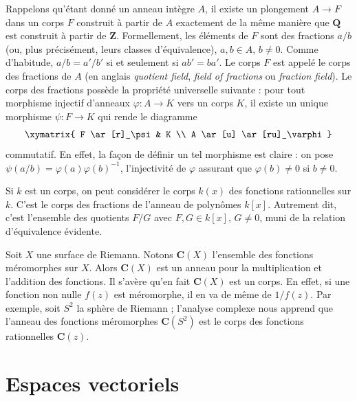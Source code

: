 \begin{example}
\label{example-quotient-field}
Rappelons qu'étant donné un anneau intègre $A$, il existe un plongement $A \to F$ dans un
corps $F$ construit à partir de $A$ exactement de la même manière que
$\mathbf{Q}$ est construit à partir de $\mathbf{Z}$. Formellement, les éléments
de $F$ sont des fractions $a/b$ (ou, plus précisément, leurs classes d'équivalence),
$a, b \in A$, $b \not = 0$. Comme d'habitude, $a/b = a'/b'$ si et seulement si $ab' = ba'$.
Le corps $F$ est appelé le corps des fractions de $A$ (en anglais
{\it quotient field}, {\it field of fractions} ou {\it fraction field}).
Le corps des fractions possède la propriété universelle suivante : pour tout
morphisme injectif d'anneaux $\varphi : A \to K$ vers un corps $K$, il existe un unique
morphisme $\psi : F \to K$ qui rende le diagramme
$$
\xymatrix{
F \ar[r]_\psi & K \\
A \ar[u] \ar[ru]_\varphi
}
$$
commutatif. En effet, la façon de définir un tel morphisme est claire : on pose
$\psi(a/b) = \varphi(a)\varphi(b)^{-1}$, l'injectivité de $\varphi$
assurant que $\varphi(b) \not = 0$ si $ b \not = 0$.
\end{example}

\begin{example}
\label{example-field-of-rational-functions}
Si $k$ est un corps, on peut considérer le corps $k(x)$ des fonctions
rationnelles sur $k$. C'est le corps des fractions de l'anneau de polynômes
$k[x]$. Autrement dit, c'est l'ensemble des quotients $F/G$ avec
$F, G \in k[x]$, $G \not = 0$, muni de la relation d'équivalence évidente.
\end{example}

\begin{example}
\label{example-field-of-meromorphic-functions}
Soit $X$ une surface de Riemann. Notons $\mathbf{C}(X)$
l'ensemble des fonctions méromorphes sur $X$. Alors $\mathbf{C}(X)$ est un anneau pour
la multiplication et l'addition des fonctions. Il s'avère qu'en fait
$\mathbf{C}(X)$ est un corps. En effet, si une fonction non nulle $f(z)$ est
méromorphe, il en va de même de $1/f(z)$. Par exemple, soit $S^2$ la sphère
de Riemann ; l'analyse complexe nous apprend que l'anneau des fonctions méromorphes
$\mathbf{C}(S^2)$ est le corps des fonctions rationnelles $\mathbf{C}(z)$.
\end{example}



\section{Espaces vectoriels}
\label{section-vector-spaces}

